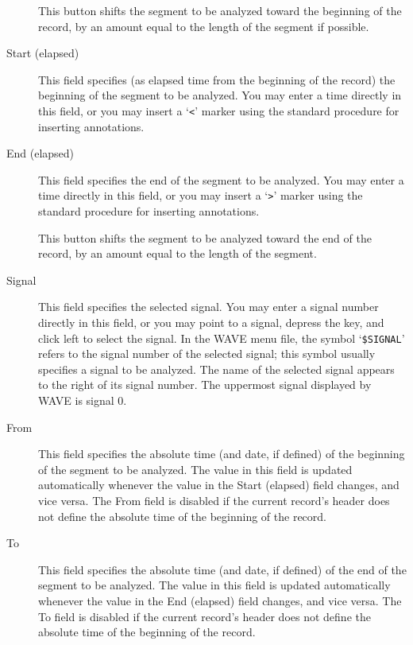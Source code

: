 \documentclass[twoside]{book}
\newcommand{\keycap}[1]{\cornersize{.5}\Ovalbox{\small\sf #1}}
\newcommand{\button}[1]{\cornersize{2}\ovalbox{\rule[-.3mm]{0cm}{2.5mm}\small\sf ~#1~}}
\newcommand{\WAVE}{{\sf WAVE}\xspace}
\begin{document}
\begin{description}
\item[\button{\tt <}]
This button shifts the segment to be analyzed toward the beginning of the
record, by an amount equal to the length of the segment if possible.

\item[{\sf Start (elapsed)}]
This field specifies (as elapsed time from the beginning of the
record) the beginning of the segment to be analyzed.  You may
enter a time directly in this field, or you may insert a `{\tt <}' marker using
the standard procedure for inserting annotations.

\item[{\sf End (elapsed)}]
This field specifies the end of the segment to be analyzed.  You may enter a
time directly in this field, or you may insert a `{\tt >}' marker using the
standard procedure for inserting annotations.

\item[\button{\tt >}]
This button shifts the segment to be analyzed toward the end of the
record, by an amount equal to the length of the segment.

\item[{\sf Signal}]
This field specifies the selected signal.  You may enter a signal number
directly in this field, or you may point to a signal, depress the
\keycap{Shift} key, and click left to select the signal.  In the \WAVE{}
menu file, the symbol `{\tt \$SIGNAL}' refers to the signal number of the
selected signal; this symbol usually specifies a signal to be analyzed.  The
name of the selected signal appears to the right of its signal number.  The
uppermost signal displayed by \WAVE{} is signal 0.

\item[{\sf From}]
This field specifies the absolute time (and date, if defined) of the
beginning of the segment to be analyzed.  The value in this field is
updated automatically whenever the value in the {\sf Start (elapsed)}
field changes, and vice versa.  The {\sf From} field is disabled if
the current record's header does not define the absolute time of the
beginning of the record.

\item[{\sf To}]
This field specifies the absolute time (and date, if defined) of the
end of the segment to be analyzed.  The value in this field is updated
automatically whenever the value in the {\sf End (elapsed)} field
changes, and vice versa.  The {\sf To} field is disabled if the
current record's header does not define the absolute time of the
beginning of the record.


\end{description}
\end{document}
